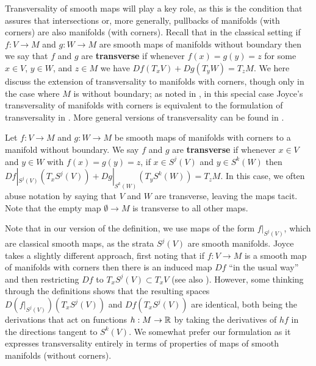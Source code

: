 Transversality of smooth maps will play a key role, as this is the condition that assures that intersections or, more generally, pullbacks of manifolds (with corners) are also manifolds (with corners).
Recall that in the classical setting if $f \colon V \to M$ and $g \colon W \to M$ are smooth maps of manifolds without boundary then we say that $f$ and $g$ are \textbf{transverse} if whenever $f(x) = g(y) = z$ for some $x \in V$, $y \in W$, and $z \in M$ we have $Df(T_xV)+Dg(T_yW) = T_z M$.
We here discuss the extension of transversality to manifolds with corners, though only in the case where $M$ is without boundary; as noted in \cite[Remark 6.3]{Joy12}, in this special case Joyce's transversality of manifolds with corners is equivalent to the formulation of transversality in \cite[Section 7.2]{MaDo92}.
More general versions of transversality can be found in \cite[Section 6]{Joy12}.

\begin{definition}{\cite[Special case of Definition 6.1]{Joy12}}
	Let $f \colon V \to M$ and $g \colon W \to M$ be smooth maps of manifolds with corners to a manifold without boundary.
	We say $f$ and $g$ are \textbf{transverse} if whenever $x \in V$ and $y\in W$ with $f(x) = g(y) = z$, if $x\in S^j(V)$ and $y \in S^k(W)$ then $Df|_{S^j(V)}(T_xS^j(V))+Dg|_{S^k(W)}(T_yS^k(W)) = T_zM$.
	In this case, we often abuse notation by saying that $V$ and $W$ are transverse, leaving the maps tacit.
	Note that the empty map $\emptyset \to M$ is transverse to all other maps.
\end{definition}

Note that in our version of the definition, we use maps of the form $f|_{S^j(V)}$, which are classical smooth maps, as the strata $S^j(V)$ are smooth manifolds. Joyce takes a slightly different approach, first noting that if $f:V\to M$ is a smooth map of manifolds with corners then there is an induced map $Df$ ``in the usual way'' \cite[Definition 3.2]{Joy12} and then restricting $Df$ to $T_xS^j(V)\subset T_xV$ (see also \cite[Proposition 2.4]{Joy12}). However, some thinking through the definitions shows that the resulting spaces $D(f|_{S^j(V)})(T_xS^j(V))$ and $Df(T_xS^j(V))$ are identical, both being the derivations that act on functions $h:M\to \mathbb{R}$ by taking the derivatives of $hf$ in the directions tangent to $S^k(V)$. We somewhat prefer our formulation as it expresses transversality entirely in terms of properties of maps of smooth manifolds (without corners).

